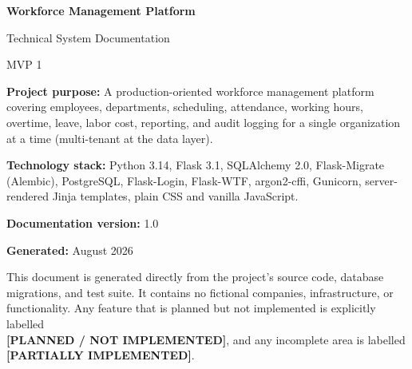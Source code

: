 \documentclass[11pt,twoside]{report}
\newcommand{\PARTIAL}{\textcolor{managercolor}{\textbf{[PARTIALLY IMPLEMENTED]}}}
\newcommand{\PLANNED}{\textcolor{plannedcolor}{\textbf{[PLANNED / NOT IMPLEMENTED]}}}
\begin{document}
\begin{titlepage}
\centering
\vspace*{2.5cm}

{\Huge\bfseries\color{inkblue} Workforce Management Platform\par}
\vspace{0.6cm}
{\LARGE\color{accent} Technical System Documentation\par}
\vspace{0.3cm}
{\Large\color{muted} MVP 1\par}

\vspace{2.5cm}

\begin{minipage}{0.8\textwidth}
\centering
\small
\textbf{Project purpose:} A production-oriented workforce management
platform covering employees, departments, scheduling, attendance,
working hours, overtime, leave, labor cost, reporting, and audit
logging for a single organization at a time (multi-tenant at the data
layer).

\vspace{0.4cm}
\textbf{Technology stack:} Python 3.14, Flask 3.1, SQLAlchemy 2.0,
Flask-Migrate (Alembic), PostgreSQL, Flask-Login, Flask-WTF,
argon2-cffi, Gunicorn, server-rendered Jinja templates, plain CSS and
vanilla JavaScript.

\vspace{0.4cm}
\textbf{Documentation version:} 1.0

\vspace{0.2cm}
\textbf{Generated:} August 2026
\end{minipage}

\vfill

{\footnotesize\color{muted} This document is generated directly from the
project's source code, database migrations, and test suite. It contains
no fictional companies, infrastructure, or functionality. Any feature
that is planned but not implemented is explicitly labelled\\
\PLANNED, and any incomplete area is labelled \PARTIAL.\par}

\end{titlepage}

\tableofcontents
\clearpage










\end{document}
